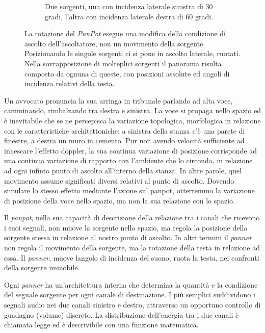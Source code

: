 \begin{figure}[t!]
\begin{subfigure}[t]{0.9\textwidth}
        \caption{Due sorgenti, una con incidenza laterale sinistra di 30 gradi,
        l'altra con incidenza laterale destra di 60 gradi.}
        \label{pan:both}
    \end{subfigure}
    \caption{La rotazione del \emph{PanPot} esegue una modifica della condizione
    di ascolto dell'ascoltatore, non un movimento della sorgente. Posizionando
    le singole sorgenti ci si pone in ascolto laterale, ruotati. Nella
    sovrapposizione di molteplici sorgenti il panorama risulta composto da
    ognuna di queste, con posizioni assolute ed angoli di incidenza relativi
    della testa.}
    \label{pan:all}
\end{figure}

Un avvocato pronuncia la sua arringa in tribunale parlando ad alta voce,
camminando, rimbalzando tra destra e sinistra. La voce si propaga nello spazio
ed è inevitabile che se ne percepisca la variazione topologica, morfologica in
relazione con le caratteristiche architettoniche: a sinistra della stanza c'è
una parete di finestre, a destra un muro in cemento. Pur non avendo velocità
sufficiente ad innescare l'effetto doppler, la sua continua variazione di
posizione corrisponde ad una continua variazione di rapporto con l'ambiente che
lo circonda, in relazione ad ogni infinto punto di ascolto all'interno della
stanza. In altre parole, quel movimento assume significati diversi relativi al
punto di ascolto. Dovendo simulare lo stesso effetto mediante l'azione sul panpot, otterremmo la
variazione di posizione della voce nello spazio, ma non la sua relazione con lo
spazio.



Il \emph{panpot}, nella sua capacità di descrizione della relazione tra i canali
che ricevono i suoi segnali, non muove la sorgente nello spazio, ma regola la
posizione della sorgente stessa in relazione al nostro punto di ascolto. In
altri termini il \emph{panner} non regola il movimento della sorgente, ma la
rotazione della testa in relazione ad essa. Il \emph{panner}, muove langolo di
incidenza del suono, ruota la testa, nei confronti della sorgente immobile.

Ogni \emph{panner} ha un'architettura interna che determina la quantità e la
condizione del segnale sorgente per ogni canale di destinazione. I più semplici
suddividono i segnali audio nei due canali sinistro e destro, attraverso un
opportuno controllo di guadagno (volume) discreto. La distribuzione dell'energia
tra i due canali è chiamata legge ed è descrivibile con una funzione matematica.

